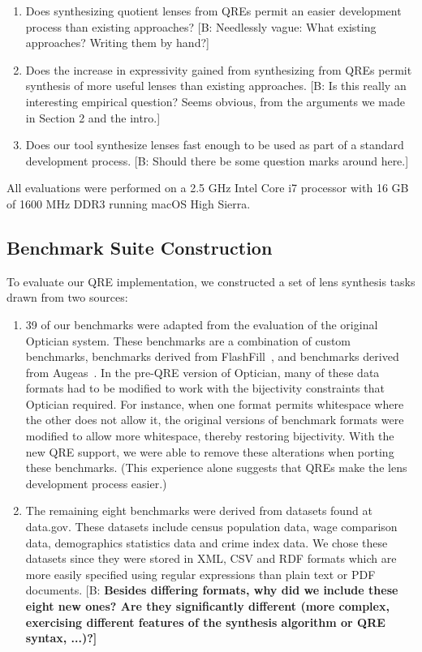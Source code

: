\documentclass[acmsmall,review,anonymous]{acmart}
\newcommand{\FINISH}[3]{\ifdraft\textcolor{#1}{[#2: #3]}\fi}
\newcommand{\bcp}[1]{\FINISH{dkred}{B}{#1}}
\newcommand{\BCP}[1]{\FINISH{dkred}{B}{\bf #1}}
\begin{document}
\begin{enumerate}
  \item Does synthesizing quotient lenses from QREs permit an easier development
  process than existing approaches?  \bcp{Needlessly vague: What existing approaches?  Writing
  them by hand?}
  
  \item Does the increase in expressivity gained from synthesizing from QREs
  permit synthesis of more useful lenses than existing approaches.  \bcp{Is
    this really an interesting empirical question?  Seems obvious, from the
    arguments we made in Section 2 and the intro.}
  
  \item Does our tool synthesize lenses fast enough to be used as part of a
  standard development process.  \bcp{Should there be some question marks
    around here.}
\end{enumerate}

All evaluations were performed on a 2.5 GHz Intel Core i7 processor with 16 GB
of 1600 MHz DDR3 running macOS High Sierra.


\subsection{Benchmark Suite Construction}

To evaluate our QRE implementation, we constructed a set of lens synthesis tasks
drawn from two sources:
\begin{enumerate}
\item 39 of our benchmarks were adapted from the evaluation of the original
  Optician system.  These benchmarks are a combination of custom benchmarks,
  benchmarks derived from FlashFill~\cite{flashfill}, and benchmarks
  derived from Augeas~\cite{augeas2}. In the pre-QRE version of
  Optician, many of these data formats had to be modified to work with the
  bijectivity constraints that Optician required.  For instance, when one format
  permits whitespace where the other does not allow it, the original versions of
  benchmark formats were modified to allow more whitespace, thereby restoring
  bijectivity.  With the new QRE support, we were able to remove these
  alterations when porting these benchmarks.  (This experience alone suggests
  that QREs make the lens development process easier.)
  
\item The remaining eight benchmarks were derived from datasets found at 
  data.gov. These datasets include census
  population data, wage comparison data, demographics statistics data and
  crime index data. We chose these datasets since they were stored in XML, CSV
  and RDF formats which are more easily specified using regular expressions than
  plain text or PDF documents.  \BCP{Besides differing formats, why did we
    include these eight new 
    ones?  Are they significantly different (more complex, exercising
    different features of the synthesis algorithm or QRE syntax, ...)?}
\end{enumerate}
\end{document}
